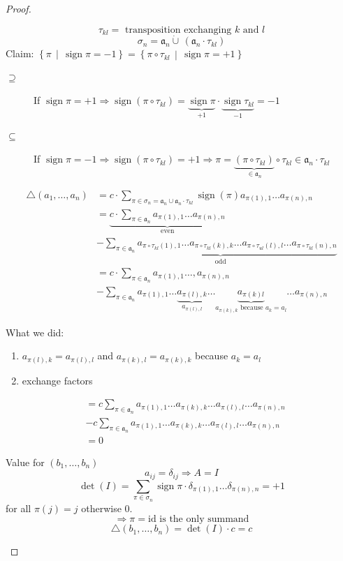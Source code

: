 \documentclass[a4paper,landscape,twocolumn]{article}
\newcommand\setdef[2]{\left\{#1\,\middle|\,#2\right\}}
\DeclareMathOperator\sign{sign}
\begin{document}
\begin{proof}
\begin{enumerate}
      \[ \tau_{kl} = \text{ transposition exchanging $k$ and $l$} \]
      \[ \sigma_n = \mathfrak a_n \dot\cup\, (\mathfrak a_n \cdot \tau_{kl}) \]
      Claim: $\setdef{\pi}{\sign{\pi} = -1} = \setdef{\pi \circ \tau_{kl}}{\sign{\pi} = +1}$
      \begin{description}
        \item[$\supseteq$] If $\sign{\pi} = +1 \Rightarrow \sign(\pi \circ \tau_{kl}) = \underbrace{\sign{\pi}}_{+1} \cdot \underbrace{\sign{\tau_{kl}}}_{-1} = -1$
        \item[$\subseteq$] If $\sign{\pi} = -1 \Rightarrow \sign(\pi \circ \tau_{kl}) = +1 \Rightarrow \pi = \underbrace{(\pi \circ \tau_{kl})}_{\in \mathfrak a_n} \circ \tau_{kl} \in \mathfrak a_n \cdot \tau_{kl}$
      \end{description}
      \begin{align*}
        \triangle(a_1, \ldots, a_n)
          &= c \cdot \sum_{\pi \in \sigma_n = \mathfrak a_n \cup \mathfrak a_n \cdot \tau_{kl}}
            \sign(\pi) a_{\pi(1),1} \ldots a_{\pi(n),n} \\
          &= \underbrace{c \cdot \sum_{\pi \in \mathfrak a_n} a_{\pi(1),1} \ldots a_{\pi(n),n}}_{\text{even}} \\
          &- \underbrace{\sum_{\pi \in \mathfrak a_n} a_{\pi \circ \tau_{kl}(1),1} \ldots a_{\pi \circ \tau_{kl}(k),k} \ldots a_{\pi \circ \tau_{ul}(l),l} \ldots a_{\pi \circ \tau_{kl}(n),n}}_{\text{odd}} \\
          &= c \cdot \sum_{\pi \in \mathfrak a_n} a_{\pi(1),1} \ldots, a_{\pi(n),n} \\
          &- \sum_{\pi \in \mathfrak a_n} a_{\pi(1),1} \ldots \underbrace{a_{\pi(l),k}}_{a_{\pi(l),l}} \ldots \underbrace{a_{\pi(k)l}}_{a_{\pi(k),k} \text{ because } a_k=a_l} \ldots a_{\pi(n),n}
      \end{align*}

      What we did:
      \begin{enumerate}
        \item $a_{\pi(l),k} = a_{\pi(l),l}$ and $a_{\pi(k),l} = a_{\pi(k),k}$ because $a_k = a_l$
        \item exchange factors
      \end{enumerate}

      \begin{align*}
        &= c \sum_{\pi \in \mathfrak a_n} a_{\pi(1),1} \ldots a_{\pi(k),k} \ldots a_{\pi(l),l} \ldots a_{\pi(n),n} \\
        &- c \sum_{\pi \in \mathfrak a_n} a_{\pi(1),1} \ldots a_{\pi(k),k} \ldots a_{\pi(l),l} \ldots a_{\pi(n),n} \\
        &= 0
      \end{align*}

      Value for $(b_1, \ldots, b_n)$
      \[ a_{ij} = \delta_{ij} \Rightarrow A = I \]
      \[ \det(I) = \sum_{\pi \in \sigma_n} \sign{\pi} \cdot \delta_{\pi(1),1} \ldots \delta_{\pi(n),n} = +1 \]
      for all $\pi(j)=j$ otherwise $0$.
      \[ \Rightarrow \pi = \text{id} \text{ is the only summand} \]
      \[ \triangle(b_1, \ldots, b_n) = \det(I) \cdot c = c \]
  \end{enumerate}
\end{proof}
\end{document}

